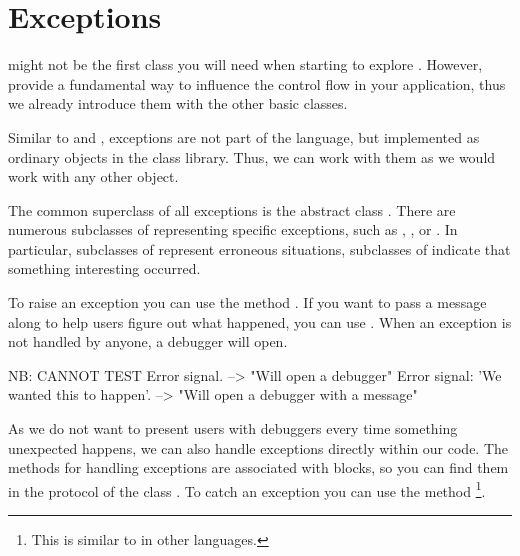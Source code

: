\documentclass[a4paper,10pt,twoside]{book}
\begin{document}

\section{Exceptions}

 might not be the first class you will need when starting to explore \sq. 
However,  provide a fundamental way to influence the control flow in your application, thus we already introduce them with the other basic classes.

Similar to  and , exceptions are not part of the language, but implemented as ordinary objects in the class library. 
Thus, we can work with them as we would work with any other object.

The common superclass of all exceptions is the abstract class .
There are numerous subclasses of  representing specific exceptions, such as , , or .
In particular, subclasses of  represent erroneous situations, subclasses of  indicate that something interesting occurred.

To raise an exception you can use the method .
If you want to pass a message along to help users figure out what happened, you can use .
When an exception is not handled by anyone, a debugger will open.

\begin{code}{NB: CANNOT TEST}
Error signal. --> "Will open a debugger"
Error signal: 'We wanted this to happen'. --> "Will open a debugger with a message"
\end{code}

As we do not want to present users with debuggers every time something unexpected happens, we can also handle exceptions directly within our code.
The methods for handling exceptions are associated with blocks, so you can find them in the  protocol of the class .
To catch an exception you can use the method \footnote{This is similar to  in other languages.}.
\end{document}
